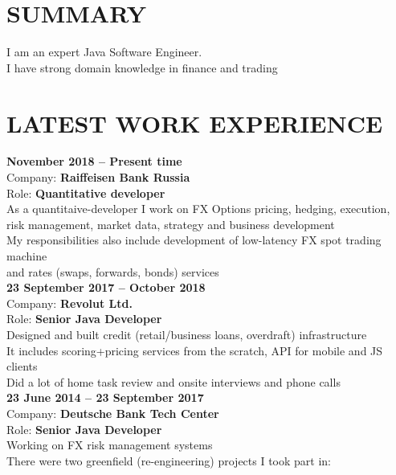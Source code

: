 \documentclass[margin,12pt]{res}
\begin{document}
  \address{
    kremsnx@gmail.com\\}

\begin{resume}
\section{SUMMARY}
I am an expert Java Software Engineer.\\
I have strong domain knowledge in
finance and trading

\section{LATEST WORK EXPERIENCE}
\textbf{November 2018 -- Present time}\\
Company: \textbf{Raiffeisen Bank Russia}\\
Role: \textbf{Quantitative developer}\\
As a quantitaive-developer I work on FX Options pricing, hedging, execution,\\
risk management, market data, strategy and business development\\
My responsibilities also include development of low-latency FX spot trading machine\\
and rates (swaps, forwards, bonds) services\\
\newline
\textbf{23 September 2017 -- October 2018}\\
Company: \textbf{Revolut Ltd.}\\
Role: \textbf{Senior Java Developer}\\
Designed and built credit (retail/business loans, overdraft) infrastructure\\
It includes scoring+pricing services from the scratch, API for mobile and JS\\ clients\\
Did a lot of home task review and onsite interviews and phone calls\\
\newline
\textbf{23 June 2014 -- 23 September 2017}\\
Company: \textbf{Deutsche Bank Tech Center}\\
Role: \textbf{Senior Java Developer}\\
Working on FX risk management systems\\
There were two greenfield (re-engineering) projects I took part in:

\end{resume}
\end{document}
